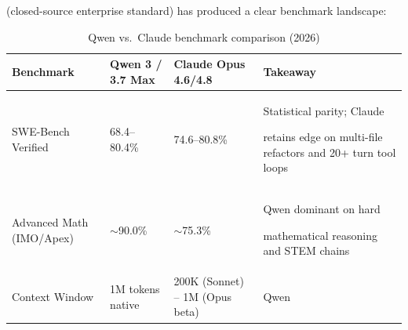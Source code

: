 (closed-source enterprise standard) has produced a clear benchmark landscape:











\begin{table}[h]





\centering





\caption{Qwen vs.\ Claude benchmark comparison (2026)}





\begin{tabular}{p{3.8cm}p{2.5cm}p{2.8cm}p{4cm}}





\toprule





\textbf{Benchmark} & \textbf{Qwen 3 / 3.7 Max} & \textbf{Claude Opus 4.6/4.8} & \textbf{Takeaway} \\





\midrule





SWE-Bench Verified & 68.4--80.4\% & 74.6--80.8\% & Statistical parity; Claude





  retains edge on multi-file refactors and 20+ turn tool loops \\





Advanced Math (IMO/Apex) & $\sim$90.0\% & $\sim$75.3\% & Qwen dominant on hard





  mathematical reasoning and STEM chains \\





Context Window & 1M tokens native & 200K (Sonnet) -- 1M (Opus beta) & Qwen






\end{tabular}
\end{table}
